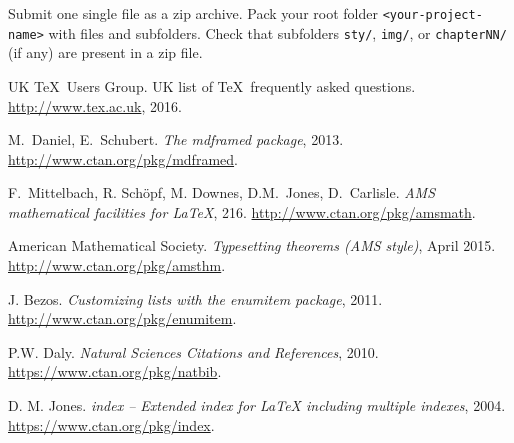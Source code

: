 \documentclass{ltxdoc}
\def\file#1{\texttt{#1}}
\begin{document}
Submit one single file as a zip archive. 
Pack your root folder \verb!<your-project-name>! with files and subfolders. 
Check that subfolders \file{sty/}, \file{img/}, or \file{chapterNN/} (if any) are 
present in a zip file.

\begin{thebibliography}{9}
 UK \TeX\ Users Group. UK list of \TeX\ frequently asked questions. 
\url{http://www.tex.ac.uk}, 2016.

M.~Daniel, E.~Schubert. \textit{The mdframed package}, 
2013. \url{http://www.ctan.org/pkg/mdframed}.

F.~Mittelbach, R. Sch\"opf, M. Downes, D.M.~Jones, D.~Carlisle. \textit{AMS mathematical facilities for \LaTeX}, 216. \url{http://www.ctan.org/pkg/amsmath}. 

American Mathematical Society. \textit{Typesetting theorems (AMS style)}, April 2015. 
\url{http://www.ctan.org/pkg/amsthm}.

J. Bezos. 
\textit{Customizing lists with the enumitem package}, 2011. 
\url{http://www.ctan.org/pkg/enumitem}.

P.W. Daly.
\textit{Natural Sciences Citations and References}, 
2010. 
\url{https://www.ctan.org/pkg/natbib}.

D. M. Jones.
\textit{index – Extended index for LaTeX including multiple indexes}, 2004.
\url{https://www.ctan.org/pkg/index}.

\end{thebibliography}
\end{document}
